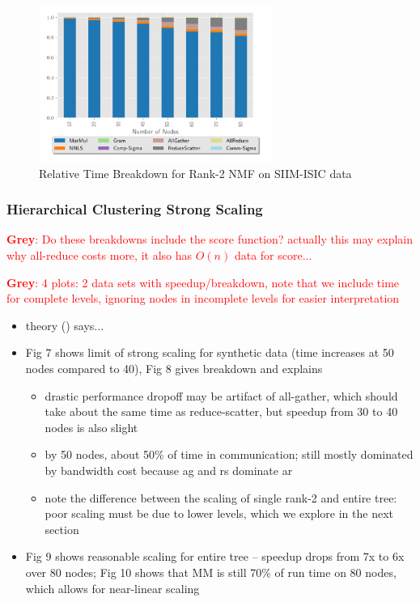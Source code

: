 \documentclass[conference,compsoc]{IEEEtran}
\newcommand{\GB}[1]{\textcolor{red}{\textbf{Grey}: #1}}
\newcommand{\image}{SIIM-ISIC}
\begin{document}
\begin{figure}
\begin{center}
\includegraphics[height=2in, width=\columnwidth]{plots/realworld_rank2_strongscaling.pdf}
\caption{Relative Time Breakdown for Rank-2 NMF on \image{} data}
\label{fig:rwrank2strongscaling}
\end{center}
\end{figure}



\subsubsection{Hierarchical Clustering Strong Scaling}

\GB{Do these breakdowns include the score function?  actually this may explain why all-reduce costs more, it also has $O(n)$ data for score...}

\GB{4 plots: 2 data sets with speedup/breakdown, note that we include time for complete levels, ignoring nodes in incomplete levels for easier interpretation}

\begin{itemize}
	\item theory () says...
	\item Fig 7 shows limit of strong scaling for synthetic data (time increases at 50 nodes compared to 40), Fig 8 gives breakdown and explains
	\begin{itemize}
		\item drastic performance dropoff may be artifact of all-gather, which should take about the same time as reduce-scatter, but speedup from 30 to 40 nodes is also slight
		\item by 50 nodes, about 50\% of time in communication; still mostly dominated by bandwidth cost because ag and rs dominate ar
		\item note the difference between the scaling of single rank-2 and entire tree: poor scaling must be due to lower levels, which we explore in the next section
	\end{itemize}
	\item Fig 9 shows reasonable scaling for entire tree -- speedup drops from 7x to 6x over 80 nodes; Fig 10 shows that MM is still 70\% of run time on 80 nodes, which allows for near-linear scaling
\end{itemize}
\end{document}
